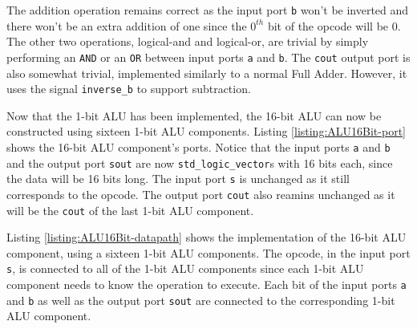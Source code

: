 \documentclass[11pt]{report}
\begin{document}
The addition operation remains correct as the input port \verb|b| won't be inverted and there
won't be an extra addition of one since the $0^{th}$ bit of the opcode will be $0$. The other two
operations, logical-and and logical-or, are trivial by simply performing an \verb|AND| or an
\verb|OR| between input ports \verb|a| and \verb|b|. The \verb|cout| output port is also somewhat
trivial, implemented similarly to a normal Full Adder. However, it uses the signal \verb|inverse_b|
to support subtraction.


Now that the 1-bit ALU has been implemented, the 16-bit ALU can now be constructed using sixteen
1-bit ALU components. Listing \ref{listing:ALU16Bit-port} shows the 16-bit ALU component's ports.
Notice that the input ports \verb|a| and \verb|b| and the output port \verb|sout| are now
\verb|std_logic_vector|s with 16 bits each, since the data will be 16 bits long. The input port
\verb|s| is unchanged as it still corresponds to the opcode. The output port \verb|cout| also
reamins unchanged as it will be the \verb|cout| of the last 1-bit ALU component.

\newpage


Listing \ref{listing:ALU16Bit-datapath} shows the implementation of the 16-bit ALU component, using
a sixteen 1-bit ALU components. The opcode, in the input port \verb|s|, is connected to all of the
1-bit ALU components since each 1-bit ALU component needs to know the operation to execute. Each bit
of the input ports \verb|a| and \verb|b| as well as the output port \verb|sout| are connected to the
corresponding 1-bit ALU component.
\end{document}
